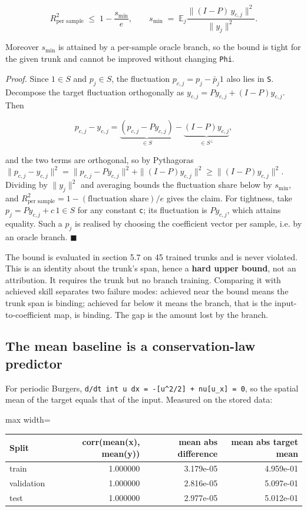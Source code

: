 \documentclass[preprint,12pt]{elsarticle}
\begin{document}
\[
  R^2_{\text{per sample}} \;\le\; 1 - \frac{s_{\min}}{e},
  \qquad
  s_{\min} \;=\; \mathbb{E}_j \frac{\|(I-P)\,y_{c,j}\|^2}{\|y_j\|^2} .
\]

Moreover $s_{\min}$ is attained by a per-sample oracle branch, so the bound is tight for the given trunk and cannot be improved without changing \texttt{Phi}.

\emph{Proof.} Since $1 \in S$ and $p_j \in S$, the fluctuation $p_{c,j} = p_j - \bar p_j 1$ also lies in \texttt{S}. Decompose the target fluctuation orthogonally as $y_{c,j} = P y_{c,j} + (I-P) y_{c,j}$. Then

\[
  p_{c,j} - y_{c,j} = \underbrace{(p_{c,j} - P y_{c,j})}_{\in S}
                      - \underbrace{(I-P) y_{c,j}}_{\in S^\perp},
\]

and the two terms are orthogonal, so by Pythagoras $\|p_{c,j} - y_{c,j}\|^2 = \|p_{c,j} - P y_{c,j}\|^2 + \|(I-P)y_{c,j}\|^2 \ge
\|(I-P)y_{c,j}\|^2$. Dividing by $\|y_j\|^2$ and averaging bounds the fluctuation share below by $s_{\min}$, and $R^2_{\text{per sample}} = 1 - (\text{fluctuation share})/e$ gives the claim. For tightness, take $p_j = P y_{c,j} + c\,1 \in S$ for any constant \texttt{c}; its fluctuation is $P y_{c,j}$, which attains equality. Such a $p_j$ is realised by choosing the coefficient vector per sample, i.e. by an oracle branch. $\blacksquare$

The bound is evaluated in section 5.7 on 45 trained trunks and is never violated. This is an identity about the trunk's span, hence a \textbf{hard upper bound}, not an attribution. It requires the trunk but no branch training. Comparing it with achieved skill separates two failure modes: achieved near the bound means the trunk span is binding; achieved far below it means the branch, that is the input-to-coefficient map, is binding. The gap is the amount lost by the branch.

\subsection{The mean baseline is a conservation-law predictor}

For periodic Burgers, \texttt{d/dt int u dx = -[u\^{}2/2] + nu[u\_x] = 0}, so the spatial mean of the target equals that of the input. Measured on the stored data:

\begin{center}
\begin{adjustbox}{max width=\linewidth}
\small
\begin{tabular}{lrrr}
\toprule
Split & corr(mean(x), mean(y)) & mean abs difference & mean abs target mean \\
\midrule
train & 1.000000 & 3.179e-05 & 4.959e-01 \\
validation & 1.000000 & 2.816e-05 & 5.097e-01 \\
test & 1.000000 & 2.977e-05 & 5.012e-01 \\
\bottomrule
\end{tabular}
\end{adjustbox}
\end{center}
\end{document}
